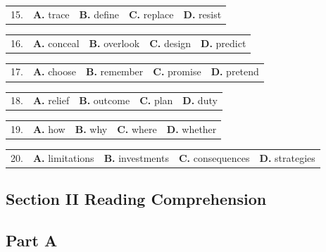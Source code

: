 \documentclass[UTF8,11pt]{ctexart}
\begin{document}
\noindent\begin{tabularx}{\linewidth}{@{}lXXXX@{}}15. & \textbf{A.} trace & \textbf{B.} define & \textbf{C.} replace & \textbf{D.} resist\\\end{tabularx}\par

\noindent\begin{tabularx}{\linewidth}{@{}lXXXX@{}}16. & \textbf{A.} conceal & \textbf{B.} overlook & \textbf{C.} design & \textbf{D.} predict\\\end{tabularx}\par

\noindent\begin{tabularx}{\linewidth}{@{}lXXXX@{}}17. & \textbf{A.} choose & \textbf{B.} remember & \textbf{C.} promise & \textbf{D.} pretend\\\end{tabularx}\par

\noindent\begin{tabularx}{\linewidth}{@{}lXXXX@{}}18. & \textbf{A.} relief & \textbf{B.} outcome & \textbf{C.} plan & \textbf{D.} duty\\\end{tabularx}\par

\noindent\begin{tabularx}{\linewidth}{@{}lXXXX@{}}19. & \textbf{A.} how & \textbf{B.} why & \textbf{C.} where & \textbf{D.} whether\\\end{tabularx}\par

\noindent\begin{tabularx}{\linewidth}{@{}lXXXX@{}}20. & \textbf{A.} limitations & \textbf{B.} investments & \textbf{C.} consequences & \textbf{D.} strategies\\\end{tabularx}\par

\subsection*{\textbf{Section II Reading Comprehension}}


\subsection*{\textbf{Part A}}
\end{document}
